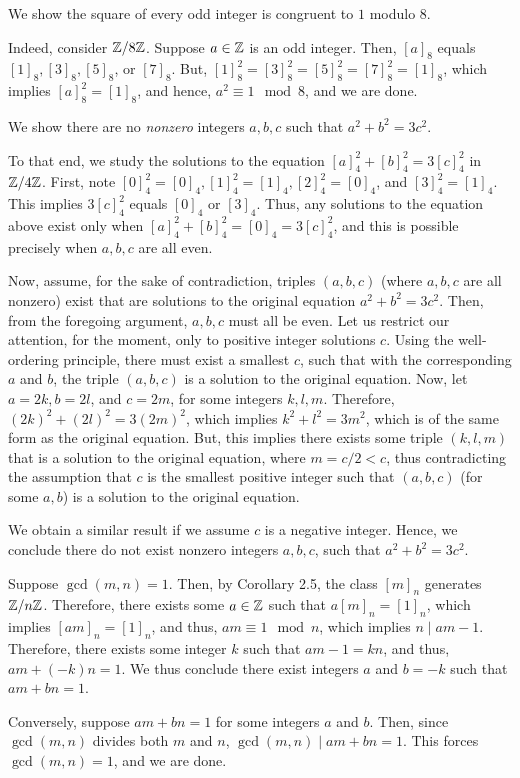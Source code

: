 \begin{xca}
We show the square of every odd integer is congruent to $1$ modulo $8$.

Indeed, consider $\mathbb{Z}/{8\mathbb{Z}}$. Suppose $a \in \mathbb{Z}$ is an odd integer. Then, $[a]_8$
equals $[1]_8, [3]_8, [5]_8$, or $[7]_8$. But, $[1]_8^2 = [3]_8^2 = [5]_8^2 =
[7]_8^2 = [1]_8$, which implies $[a]_8^2 = [1]_8$, and hence, $a^2 \equiv 1 \mod
8$, and we are done.
\end{xca}

\begin{xca}
We show there are no \emph{nonzero} integers $a, b, c$ such that $a^2 + b^2 =
3c^2$.

To that end, we study the solutions to the equation $[a]_4^2 + [b]_4^2 =
3[c]_4^2$ in $\mathbb{Z}/{4\mathbb{Z}}$. First, note $[0]_4^2 = [0]_4, [1]_4^2 = [1]_4, [2]_4^2
= [0]_4$, and $[3]_4^2 = [1]_4$. This implies $3[c]_4^2$ equals $[0]_4$ or
$[3]_4$. Thus, any solutions to the equation above exist only when $[a]_4^2 +
[b]_4^2 = [0]_4 = 3[c]_4^2$, and this is possible precisely when $a, b, c$ are
all even.

Now, assume, for the sake of contradiction, triples $(a, b, c)$ (where $a, b,
c$ are all nonzero) exist that are solutions to the original equation $a^2 +
b^2 = 3c^2$. Then, from the foregoing argument, $a, b, c$ must all be even. Let
us restrict our attention, for the moment, only to positive integer solutions
$c$. Using the well-ordering principle, there must exist a smallest $c$, such
that with the corresponding $a$ and $b$, the triple $(a, b, c)$ is a solution
to the original equation. Now, let $a = 2k, b = 2l$, and $c = 2m$, for some
integers $k, l, m$. Therefore, $(2k)^2 + (2l)^2 = 3(2m)^2$, which implies
$k^2 + l^2 = 3m^2$, which is of the same form as the original equation. But,
this implies there exists some triple $(k, l, m)$ that is a solution to the
original equation, where $m = c/2 < c$, thus contradicting the assumption that
$c$ is the smallest positive integer such that $(a, b, c)$ (for some $a, b$) is
a solution to the original equation.

We obtain a similar result if we assume $c$ is a negative integer. Hence, we
conclude there do not exist nonzero integers $a, b, c$, such that $a^2 + b^2 =
3c^2$.
\end{xca}

\begin{xca}
Suppose $\gcd(m, n) = 1$. Then, by Corollary 2.5, the class $[m]_n$ generates
$\mathbb{Z}/{n\mathbb{Z}}$. Therefore, there exists some $a \in \mathbb{Z}$ such that $a[m]_n = [1]_n$,
which implies $[am]_n = [1]_n$, and thus, $am \equiv 1 \mod n$, which implies
$n \mid am - 1$. Therefore, there exists some integer $k$ such that $am - 1 =
kn$, and thus, $am + (-k)n = 1$. We thus conclude there exist integers $a$ and
$b = -k$ such that $am + bn = 1$.

Conversely, suppose $am + bn = 1$ for some integers $a$ and $b$. Then, since
$\gcd(m, n)$ divides both $m$ and $n$, $\gcd(m, n) \mid am + bn = 1$. This
forces $\gcd(m, n) = 1$, and we are done.
\end{xca}

